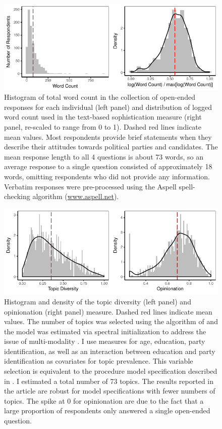 \documentclass[12pt]{article}
\begin{document}
\begin{figure}[h]\centering
\includegraphics{../fig/yg_wc.pdf}
\caption{Histogram of total word count in the collection of open-ended responses for each individual (left panel) and distribution of logged word count used in the text-based sophistication measure (right panel, re-scaled to range from 0 to 1). Dashed red lines indicate mean values. Most respondents provide brief statements when they describe their attitudes towards political parties and candidates. The mean response length to all 4 questions is about 73 words, so an average response to a single question consisted of approximately 18 words, omitting respondents who did not provide any information. Verbatim responses were pre-processed using the Aspell spell-checking algorithm (\url{www.aspell.net}).}\label{fig:yg_wc}
\end{figure}

\begin{figure}[h]\centering
\includegraphics{../fig/yg_diversity.pdf}
\caption{Histogram and density of the topic diversity (left panel) and opinionation (right panel) measure. Dashed red lines indicate mean values. The number of topics was selected using the algorithm of \citet{lee2014low} and the model was estimated via spectral initialization to address the issue of multi-modality \citep[see][for details]{roberts2014stm}. I use measures for age, education, party identification, as well as an interaction between education and party identification as covariates for topic prevalence. This variable selection is equivalent to the procedure model specification described in \citet{roberts2014structural}. I estimated a total number of 73 topics. The results reported in the article are robust for model specifications with fewer numbers of topics.  The spike at 0 for opinionation are due to the fact that a large proportion of respondents only answered a single open-ended question.}\label{fig:yg_diversity}
\end{figure}
\end{document}
